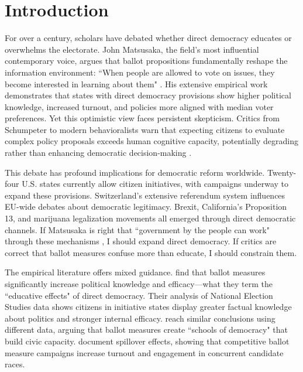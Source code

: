 \documentclass[12pt,letterpaper,oneside]{book}
\begin{document}
\section{Introduction}

For over a century, scholars have debated whether direct democracy educates or overwhelms the electorate. John Matsusaka, the field's most influential contemporary voice, argues that ballot propositions fundamentally reshape the information environment: ``When people are allowed to vote on issues, they become interested in learning about them" \citep{matsusaka2004many, matsusaka2020let}. His extensive empirical work demonstrates that states with direct democracy provisions show higher political knowledge, increased turnout, and policies more aligned with median voter preferences. Yet this optimistic view faces persistent skepticism. Critics from Schumpeter to modern behavioralists warn that expecting citizens to evaluate complex policy proposals exceeds human cognitive capacity, potentially degrading rather than enhancing democratic decision-making \citep{schumpeter1942capitalism, lupia1994shortcuts}.

This debate has profound implications for democratic reform worldwide. Twenty-four U.S. states currently allow citizen initiatives, with campaigns underway to expand these provisions. Switzerland's extensive referendum system influences EU-wide debates about democratic legitimacy. Brexit, California's Proposition 13, and marijuana legalization movements all emerged through direct democratic channels. If Matsusaka is right that ``government by the people can work" through these mechanisms \citep{matsusaka2020let}, I should expand direct democracy. If critics are correct that ballot measures confuse more than educate, I should constrain them.

The empirical literature offers mixed guidance. \citet{smith2004educated} find that ballot measures significantly increase political knowledge and efficacy—what they term the ``educative effects" of direct democracy. Their analysis of National Election Studies data shows citizens in initiative states display greater factual knowledge about politics and stronger internal efficacy. \citet{tolbert2003virtual} reach similar conclusions using different data, arguing that ballot measures create ``schools of democracy" that build civic capacity. \citet{donovan2009same} document spillover effects, showing that competitive ballot measure campaigns increase turnout and engagement in concurrent candidate races.
\end{document}
